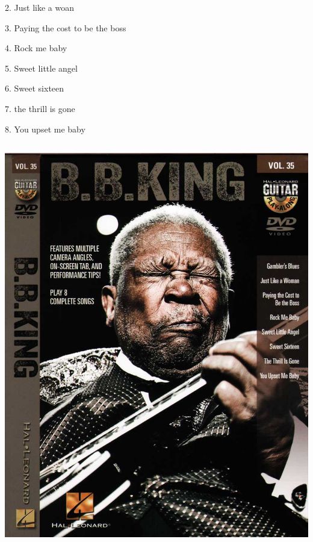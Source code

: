 \documentclass[a4paper]{book}
\begin{document}
2. Just like a woan

3. Paying the cost to be the boss

4. Rock me baby

5. Sweet little angel

6. Sweet sixteen

7. the thrill is gone

8. You upset me baby









\begin{center}
\includegraphics[width=13.995cm,height=17.713cm]{lebluessupportsmethodes-img71.jpg}
\end{center}






\clearpage
\end{document}
